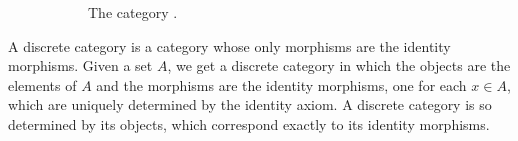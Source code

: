 \begin{example}
\begin{figure}[htb]
\begin{center}
\begin{subfigure}[t]{.3\linewidth}
\begin{center}
        \end{center}
        \caption{The category .}
        \label{fig:category-3}
      \end{subfigure}
    \end{center}
    \caption{}
    \label{fig:category-trivial}
  \end{figure}

\end{example}

\begin{example}
  \label{ex:category-discrete}


  A discrete category is a category whose only morphisms are the
  identity morphisms. Given a set $A$, we get a discrete category
   in which the objects are the elements of $A$ and the
  morphisms are the identity morphisms, one for each $x \in A$, which
  are uniquely determined by the identity axiom. A discrete category
  is so determined by its objects, which correspond exactly to its
  identity morphisms.

\end{example}


